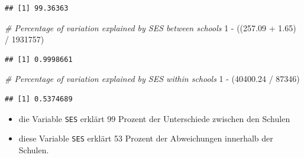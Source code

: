 \documentclass[ignorenonframetext,]{beamer}
\newenvironment{Shaded}{}{}
\newcommand{\DecValTok}[1]{\textcolor[rgb]{0.25,0.63,0.44}{{#1}}}
\newcommand{\FloatTok}[1]{\textcolor[rgb]{0.25,0.63,0.44}{{#1}}}
\newcommand{\StringTok}[1]{\textcolor[rgb]{0.25,0.44,0.63}{{#1}}}
\newcommand{\CommentTok}[1]{\textcolor[rgb]{0.38,0.63,0.69}{\textit{{#1}}}}
\newcommand{\NormalTok}[1]{{#1}}
\providecommand{\tightlist}{%
\setlength{\itemsep}{0pt}\setlength{\parskip}{0pt}}
\begin{document}
\begin{frame}[fragile]{}

\begin{Shaded}
\end{Shaded}

\begin{verbatim}
## [1] 99.36363
\end{verbatim}

\begin{Shaded}
\begin{Highlighting}[]
\CommentTok{# Percentage of variation explained by SES between schools}
\DecValTok{1} \NormalTok{-}\StringTok{ }\NormalTok{((}\FloatTok{257.09} \NormalTok{+}\StringTok{ }\FloatTok{1.65}\NormalTok{) /}\StringTok{ }\DecValTok{1931757}\NormalTok{)}
\end{Highlighting}
\end{Shaded}

\begin{verbatim}
## [1] 0.9998661
\end{verbatim}

\begin{Shaded}
\begin{Highlighting}[]
\CommentTok{# Percentage of variation explained by SES within schools}
\DecValTok{1} \NormalTok{-}\StringTok{ }\NormalTok{(}\FloatTok{40400.24} \NormalTok{/}\StringTok{ }\DecValTok{87346}\NormalTok{)}
\end{Highlighting}
\end{Shaded}

\begin{verbatim}
## [1] 0.5374689
\end{verbatim}

\begin{itemize}
\tightlist
\item
  die Variable \texttt{SES} erklärt 99 Prozent der Unterschiede zwischen
  den Schulen
\item
  diese Variable \texttt{SES} erklärt 53 Prozent der Abweichungen
  innerhalb der Schulen.
\end{itemize}

\end{frame}
\end{document}

